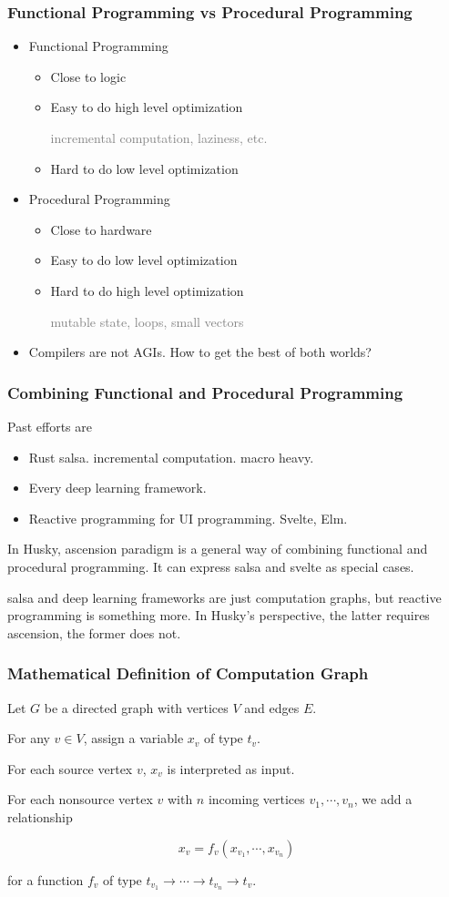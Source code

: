 \documentclass{beamer}   	%
\theoremstyle{definition}
\begin{document}
\begin{frame}
\frametitle{Functional Programming vs Procedural Programming}
\begin{itemize}
	\item Functional Programming
	\begin{itemize}
		\item Close to logic
		\item Easy to do high level optimization

		\textcolor{gray}{incremental computation, laziness, etc.}
		\item Hard to do low level optimization
	\end{itemize}
	\item Procedural Programming
	\begin{itemize}
		\item Close to hardware
		\item Easy to do low level optimization
		\item Hard to do high level optimization

		\textcolor{gray}{mutable state, loops, small vectors}
	\end{itemize}
	\item Compilers are not AGIs. How to get the best of both worlds?
\end{itemize}
\end{frame}

\begin{frame}
\frametitle{Combining Functional and Procedural Programming}
Past efforts are
\begin{itemize}
	\item Rust salsa. incremental computation. macro heavy.
	\item Every deep learning framework.
	\item Reactive programming for UI programming. Svelte, Elm.
\end{itemize}

In Husky, ascension paradigm is a general way of combining functional and procedural programming. It can express salsa and svelte as special cases.

{
\color{gray}
salsa and deep learning frameworks are just computation graphs, but reactive programming is something more. In Husky's perspective, the latter requires ascension, the former does not.}
\end{frame}

\begin{frame}
\frametitle{Mathematical Definition of Computation Graph}
Let $G$ be a directed graph with vertices $V$ and edges $E$.

For any $v\in V$, assign a variable $x_v$ of type $t_v$.

For each source vertex $v$, $x_v$ is interpreted as input.

For each nonsource vertex $v$ with $n$ incoming vertices $v_1,\cdots,v_n$, we add a relationship

$$x_v=f_v(x_{v_1},\cdots,x_{v_n})$$

for a function $f_v$ of type $t_{v_1}\to\cdots\to t_{v_n}\to t_v$.
\end{frame}
\end{document}
